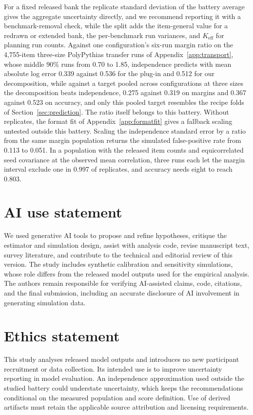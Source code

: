 For a fixed released bank the replicate standard deviation of the battery average gives the aggregate uncertainty directly, and we recommend reporting it with a benchmark-removal check, while the split adds the item-general value for a redrawn or extended bank, the per-benchmark run variances, and $K_{\mathrm{eff}}$ for planning run counts. Against one configuration's six-run margin ratio on the 4,755-item three-size PolyPythias transfer runs of Appendix~\ref{app:transport}, whose middle 90\% runs from 0.70 to 1.85, independence predicts with mean absolute log error 0.339 against 0.536 for the plug-in and 0.512 for our decomposition, while against a target pooled across configurations at three sizes the decomposition beats independence, 0.275 against 0.319 on margins and 0.367 against 0.523 on accuracy, and only this pooled target resembles the recipe folds of Section~\ref{sec:prediction}. The ratio itself belongs to this battery. Without replicates, the format fit of Appendix~\ref{app:formatfit} gives a fallback scaling untested outside this battery. Scaling the independence standard error by a ratio from the same margin population returns the simulated false-positive rate from 0.113 to 0.051. In a population with the released item counts and equicorrelated seed covariance at the observed mean correlation, three runs each let the margin interval exclude one in 0.997 of replicates, and accuracy needs eight to reach 0.803.

\label{maintext:end}
\section*{AI use statement}
We used generative AI tools to propose and refine hypotheses, critique the estimator and simulation design, assist with analysis code, revise manuscript text, survey literature, and contribute to the technical and editorial review of this version. The study includes synthetic calibration and sensitivity simulations, whose role differs from the released model outputs used for the empirical analysis. The authors remain responsible for verifying AI-assisted claims, code, citations, and the final submission, including an accurate disclosure of AI involvement in generating simulation data.

\section*{Ethics statement}
This study analyses released model outputs and introduces no new participant recruitment or data collection. Its intended use is to improve uncertainty reporting in model evaluation. An independence approximation used outside the studied battery could understate uncertainty, which keeps the recommendations conditional on the measured population and score definition. Use of derived artifacts must retain the applicable source attribution and licensing requirements.

